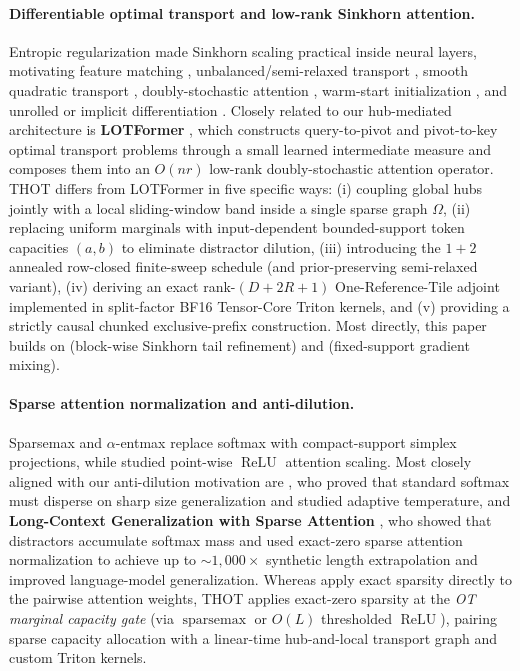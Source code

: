 \documentclass[11pt]{article}
\newcommand{\ReLU}{\operatorname{ReLU}}
\newcommand{\sparsemax}{\operatorname{sparsemax}}
\begin{document}
\paragraph{Differentiable optimal transport and low-rank Sinkhorn attention.}
Entropic regularization \citep{cuturi2013sinkhorn,peyre2019computational} made Sinkhorn scaling \citep{sinkhornknopp1967,knight2008sinkhorn} practical inside neural layers, motivating feature matching \citep{sarlin2020superglue}, unbalanced/semi-relaxed transport \citep{chizat2018scaling}, smooth quadratic transport \citep{blondel2018smooth}, doubly-stochastic attention \citep{tay2020sparse,sander2022sinkformers}, warm-start initialization \citep{thornton2023initialization}, and unrolled or implicit differentiation \citep{luise2018differential,eisenberger2022unified}. Closely related to our hub-mediated architecture is \textbf{LOTFormer} \citep{shahbazi2025lotformer}, which constructs query-to-pivot and pivot-to-key optimal transport problems through a small learned intermediate measure and composes them into an $O(nr)$ low-rank doubly-stochastic attention operator. THOT differs from LOTFormer in five specific ways: (i) coupling global hubs jointly with a local sliding-window band inside a single sparse graph $\Omega$, (ii) replacing uniform marginals with input-dependent bounded-support token capacities $(a,b)$ to eliminate distractor dilution, (iii) introducing the $1+2$ annealed row-closed finite-sweep schedule (and prior-preserving semi-relaxed variant), (iv) deriving an exact rank-$(D+2R+1)$ One-Reference-Tile adjoint implemented in split-factor BF16 Tensor-Core Triton kernels, and (v) providing a strictly causal chunked exclusive-prefix construction. Most directly, this paper builds on \citet{forde2026blockwise} (block-wise Sinkhorn tail refinement) and \citet{forde2026topology}%
{} (fixed-support gradient mixing).

\paragraph{Sparse attention normalization and anti-dilution.}
Sparsemax \citep{martins2016softmax} and $\alpha$-entmax \citep{correia2019adaptively} replace softmax with compact-support simplex projections, while \citet{wortsman2023replacing} studied point-wise $\ReLU$ attention scaling. Most closely aligned with our anti-dilution motivation are \citet{velickovic2025softmax}, who proved that standard softmax must disperse on sharp size generalization and studied adaptive temperature, and \textbf{Long-Context Generalization with Sparse Attention} \citep{vasylenko2025longcontext}, who showed that distractors accumulate softmax mass and used exact-zero sparse attention normalization to achieve up to $\sim 1{,}000\times$ synthetic length extrapolation and improved language-model generalization. Whereas \citet{vasylenko2025longcontext} apply exact sparsity directly to the pairwise attention weights, THOT applies exact-zero sparsity at the \emph{OT marginal capacity gate} (via $\sparsemax$ or $O(L)$ thresholded $\ReLU$), pairing sparse capacity allocation with a linear-time hub-and-local transport graph and custom Triton kernels.
\end{document}

